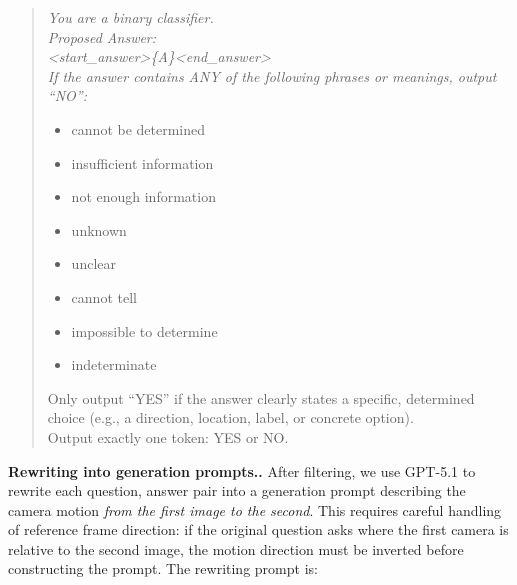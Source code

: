 \documentclass{llmxive}
\providecommand{\paragraph}[1]{\vspace{.5em}\noindent\textbf{#1.}}
\begin{document}
\begin{quote}
\itshape
You are a binary classifier.\\
Proposed Answer:\\
\textless start\_answer\textgreater\{A\}\textless end\_answer\textgreater\\
If the answer contains ANY of the following phrases or meanings, output ``NO'':
\begin{itemize}
    \item cannot be determined
    \item insufficient information
    \item not enough information
    \item unknown
    \item unclear
    \item cannot tell
    \item impossible to determine
    \item indeterminate
\end{itemize}
Only output ``YES'' if the answer clearly states a specific, determined choice (e.g., a direction, location, label, or concrete option).\\
Output exactly one token: YES or NO.
\end{quote}
 
\paragraph{Rewriting into generation prompts.}
After filtering, we use GPT-5.1 to rewrite each question, answer pair into a generation prompt describing the camera motion \emph{from the first image to the second}. This requires careful handling of reference frame direction: if the original question asks where the first camera is relative to the second image, the motion direction must be inverted before constructing the prompt. The rewriting prompt is:
 
\end{document}
